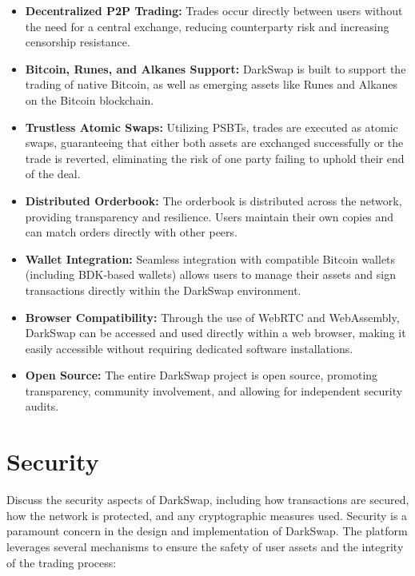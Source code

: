\documentclass{article}
\begin{document}
\begin{itemize}
    \item \textbf{Decentralized P2P Trading:} Trades occur directly between users without the need for a central exchange, reducing counterparty risk and increasing censorship resistance.
    \item \textbf{Bitcoin, Runes, and Alkanes Support:} DarkSwap is built to support the trading of native Bitcoin, as well as emerging assets like Runes and Alkanes on the Bitcoin blockchain.
    \item \textbf{Trustless Atomic Swaps:} Utilizing PSBTs, trades are executed as atomic swaps, guaranteeing that either both assets are exchanged successfully or the trade is reverted, eliminating the risk of one party failing to uphold their end of the deal.
    \item \textbf{Distributed Orderbook:} The orderbook is distributed across the network, providing transparency and resilience. Users maintain their own copies and can match orders directly with other peers.
    \item \textbf{Wallet Integration:} Seamless integration with compatible Bitcoin wallets (including BDK-based wallets) allows users to manage their assets and sign transactions directly within the DarkSwap environment.
    \item \textbf{Browser Compatibility:} Through the use of WebRTC and WebAssembly, DarkSwap can be accessed and used directly within a web browser, making it easily accessible without requiring dedicated software installations.
    \item \textbf{Open Source:} The entire DarkSwap project is open source, promoting transparency, community involvement, and allowing for independent security audits.
\end{itemize}

\section{Security}
Discuss the security aspects of DarkSwap, including how transactions are secured, how the network is protected, and any cryptographic measures used.
Security is a paramount concern in the design and implementation of DarkSwap. The platform leverages several mechanisms to ensure the safety of user assets and the integrity of the trading process:
\end{document}

